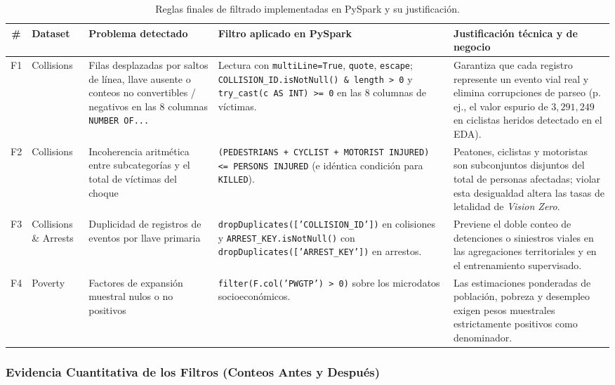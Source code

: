 \begin{table}[H]
\centering
\scriptsize
\renewcommand{\arraystretch}{1.25}
\caption{Reglas finales de filtrado implementadas en PySpark y su justificación.}
\label{tab:reglas_filtrado}
\begin{tabularx}{\linewidth}{c l >{\raggedright\arraybackslash}p{3.6cm} >{\raggedright\arraybackslash}p{4.2cm} X}
\toprule
\textbf{\#} & \textbf{Dataset} & \textbf{Problema detectado} & \textbf{Filtro aplicado en PySpark} & \textbf{Justificación técnica y de negocio} \\
\midrule
F1 & Collisions & Filas desplazadas por saltos de línea, llave ausente o conteos no convertibles / negativos en las 8 columnas \texttt{NUMBER OF...} & Lectura con \texttt{multiLine=True}, \texttt{quote}, \texttt{escape}; \texttt{COLLISION\_ID.isNotNull() \& length > 0} y \texttt{try\_cast(c AS INT) >= 0} en las 8 columnas de víctimas. & Garantiza que cada registro represente un evento vial real y elimina corrupciones de parseo (p.\,ej., el valor espurio de $3,291,249$ en ciclistas heridos detectado en el EDA). \\
F2 & Collisions & Incoherencia aritmética entre subcategorías y el total de víctimas del choque & \texttt{(PEDESTRIANS + CYCLIST + MOTORIST INJURED) <= PERSONS INJURED} (e idéntica condición para \texttt{KILLED}). & Peatones, ciclistas y motoristas son subconjuntos disjuntos del total de personas afectadas; violar esta desigualdad altera las tasas de letalidad de \textit{Vision Zero}. \\
F3 & Collisions \& Arrests & Duplicidad de registros de eventos por llave primaria & \texttt{dropDuplicates(['COLLISION\_ID'])} en colisiones y \texttt{ARREST\_KEY.isNotNull()} con \texttt{dropDuplicates(['ARREST\_KEY'])} en arrestos. & Previene el doble conteo de detenciones o siniestros viales en las agregaciones territoriales y en el entrenamiento supervisado. \\
F4 & Poverty & Factores de expansión muestral nulos o no positivos & \texttt{filter(F.col('PWGTP') > 0)} sobre los microdatos socioeconómicos. & Las estimaciones ponderadas de población, pobreza y desempleo exigen pesos muestrales estrictamente positivos como denominador. \\
\bottomrule
\end{tabularx}
\end{table}

\subsubsection{Evidencia Cuantitativa de los Filtros (Conteos Antes y Después)}

